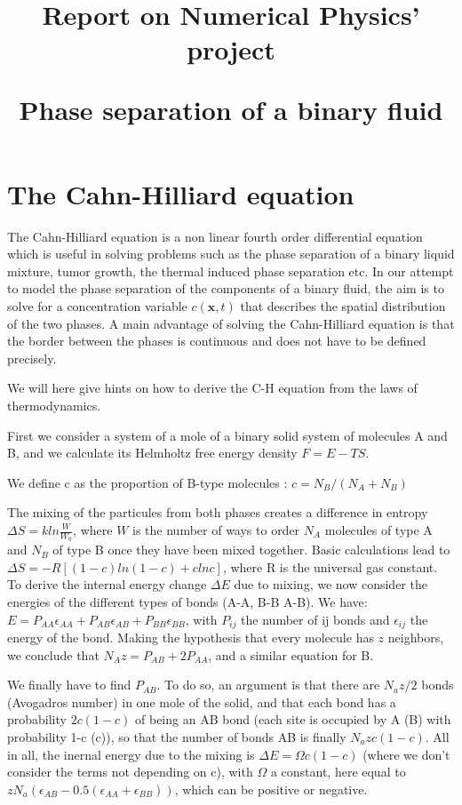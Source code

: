 \documentclass[a4paper]{article}
\begin{document}
\title{Report on Numerical Physics' project

\bf{Phase separation of a binary fluid}  
}
\maketitle
\pagebreak

\tableofcontents
\pagebreak

\section{The Cahn-Hilliard equation}
The Cahn-Hilliard equation is a non linear fourth order differential equation which is useful in solving problems such as the phase separation of a binary liquid mixture, tumor growth, the thermal induced phase separation etc. In our attempt to model the phase separation of the components of a binary fluid, the aim is to solve for a concentration variable $c(\mathbf{x}, t)$ that describes the spatial distribution of the two phases. A main advantage of solving the Cahn-Hilliard equation is that the border between the phases is continuous and does not have to be defined precisely.

We will here give hints on how to derive the C-H equation from the laws of thermodynamics.

First we consider a system of a mole of a binary solid system of molecules A and B, and we calculate its Helmholtz free energy density $F=E-TS$.

We define c as the proportion of B-type molecules : $c=N_B/(N_A+N_B)$

The mixing of the particules from both phases creates a difference in entropy $\Delta S=kln\frac{W}{W_0}$, where $W$ is the number of ways to order $N_A$ molecules of type A and $N_B$ of type B once they have been mixed together. Basic calculations lead to $\Delta S=-R[(1-c)ln(1-c)+c  ln c]$, where R is the universal gas constant.\\

To derive the internal energy change $\Delta E$ due to mixing, we now consider the energies of the different types of bonds (A-A, B-B A-B). 
We have: $E=P_{AA}\epsilon_{AA}+P_{AB}\epsilon_{AB}+P_{BB}\epsilon_{BB}$, with $P_{ij}$ the number of ij bonds and $\epsilon_{ij}$ the energy of the bond. Making the hypothesis that every molecule has $z$ neighbors, we conclude that $N_Az=P_{AB}+2P_{AA}$, and a similar equation for B.

We finally have to find $P_{AB}$. To do so, an argument is that there are $N_az/2$ bonds (Avogadros number) in one mole of the solid, and that each bond has a probability $2c(1-c)$ of being an AB bond (each site is occupied by A (B) with probability 1-c (c)), so that the number of bonds AB is finally $N_azc(1-c)$. All in all, the inernal energy due to the mixing is $\Delta E=\Omega c(1-c)$ (where we don't consider the terms not depending on c), with $\Omega$ a constant, here equal to $zN_a(\epsilon_{AB}-0.5(\epsilon_{AA}+\epsilon_{BB}))$, which can be positive or negative.\\
\end{document}
